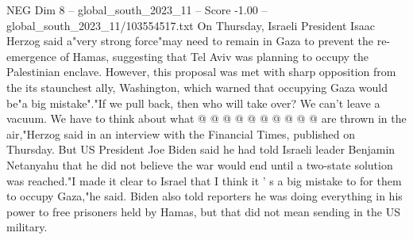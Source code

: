 \begin{textsample}{NEG Dim 8 – global\_south\_2023\_11 – Score -1.00 – global\_south\_2023\_11/103554517.txt}
On Thursday, Israeli President Isaac Herzog said a"very strong force"may need to remain in Gaza to prevent the re-emergence of Hamas, suggesting that Tel Aviv was planning to occupy the Palestinian enclave.
However, this proposal was met with sharp opposition from the its staunchest ally, Washington, which warned that occupying Gaza would be"a big mistake"."If we pull back, then who will take over?
We can't leave a vacuum.
We have to think about what @ @ @ @ @ @ @ @ @ @ are thrown in the air,"Herzog said in an interview with the Financial Times, published on Thursday.
But US President Joe Biden said he had told Israeli leader Benjamin Netanyahu that he did not believe the war would end until a two-state solution was reached."I made it clear to Israel that I think it ' s a big mistake to for them to occupy Gaza,"he said.
Biden also told reporters he was doing everything in his power to free prisoners held by Hamas, but that did not mean sending in the US military.

\end{textsample}
